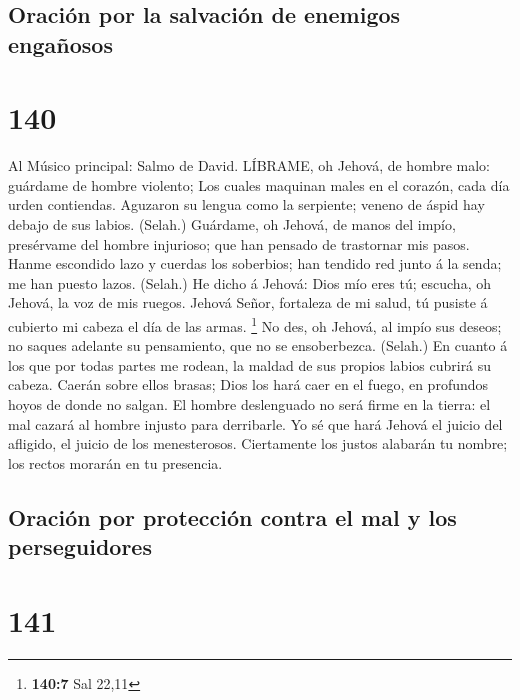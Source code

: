 \hypertarget{oraciuxf3n-por-la-salvaciuxf3n-de-enemigos-engauxf1osos}{%
\subsection{Oración por la salvación de enemigos
engañosos}\label{oraciuxf3n-por-la-salvaciuxf3n-de-enemigos-engauxf1osos}}

\hypertarget{section-139}{%
\section{140}\label{section-139}}

 Al Músico principal: Salmo de David. LÍBRAME, oh Jehová, de
hombre malo: guárdame de hombre violento;  Los cuales
maquinan males en el corazón, cada día urden contiendas. 
Aguzaron su lengua como la serpiente; veneno de áspid hay debajo de sus
labios. (Selah.)  Guárdame, oh Jehová, de manos del impío,
presérvame del hombre injurioso; que han pensado de trastornar mis
pasos.  Hanme escondido lazo y cuerdas los soberbios; han
tendido red junto á la senda; me han puesto lazos. (Selah.) 
He dicho á Jehová: Dios mío eres tú; escucha, oh Jehová, la voz de mis
ruegos.  Jehová Señor, fortaleza de mi salud, tú pusiste á
cubierto mi cabeza el día de las armas. \footnote{\textbf{140:7} Sal
  22,11}  No des, oh Jehová, al impío sus deseos; no saques
adelante su pensamiento, que no se ensoberbezca. (Selah.) 
En cuanto á los que por todas partes me rodean, la maldad de sus propios
labios cubrirá su cabeza.  Caerán sobre ellos brasas; Dios
los hará caer en el fuego, en profundos hoyos de donde no salgan.
 El hombre deslenguado no será firme en la tierra: el mal
cazará al hombre injusto para derribarle.  Yo sé que hará
Jehová el juicio del afligido, el juicio de los menesterosos.
 Ciertamente los justos alabarán tu nombre; los rectos
morarán en tu presencia.

\hypertarget{oraciuxf3n-por-protecciuxf3n-contra-el-mal-y-los-perseguidores}{%
\subsection{Oración por protección contra el mal y los
perseguidores}\label{oraciuxf3n-por-protecciuxf3n-contra-el-mal-y-los-perseguidores}}

\hypertarget{section-140}{%
\section{141}\label{section-140}}

